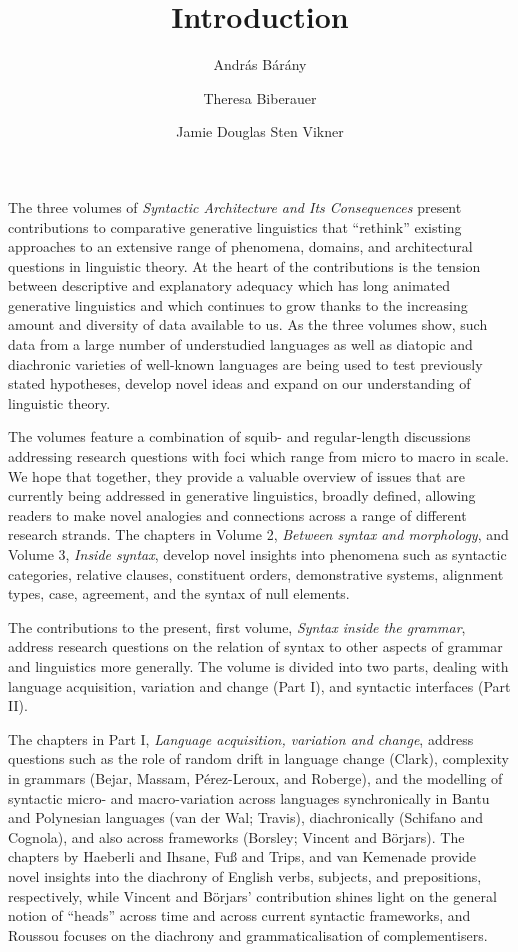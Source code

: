 \documentclass[output=paper]{langsci/langscibook}
\author{András Bárány\affiliation{Leiden University}\and
        Theresa Biberauer\affiliation{University of Cambridge, Stellenbosch
        University, University of the West Cape}\and
        Jamie Douglas\lastand
        Sten Vikner\affiliation{Aarhus University}}
\title{Introduction}
\begin{document}
\noindent The three volumes of \emph{Syntactic Architecture and Its
Consequences} present contributions to comparative generative linguistics that
\enquote{rethink} existing approaches to an extensive range of phenomena,
domains, and architectural questions in linguistic theory. At the heart of the
contributions is the tension between descriptive and explanatory adequacy which
has long animated generative linguistics and which continues to grow thanks to
the increasing amount and diversity of data available to us. As the three
volumes show, such data from a large number of understudied languages as well
as diatopic and diachronic varieties of well-known languages are being used to
test previously stated hypotheses, develop novel ideas and expand on our
understanding of linguistic theory.

The volumes feature a combination of squib- and regular-length discussions
addressing research questions with foci which range from micro to macro in
scale. We hope that together, they provide a valuable overview of issues that
are currently being addressed in generative linguistics, broadly defined,
allowing readers to make novel analogies and connections across a range of
different research strands. The chapters in Volume 2, \emph{Between syntax and
morphology}, and Volume 3, \emph{Inside syntax}, develop novel insights into
phenomena such as syntactic categories, relative clauses, constituent orders,
demonstrative systems, alignment types, case, agreement, and the syntax of null
elements.

The contributions to the present, first volume, \emph{Syntax inside the
grammar}, address research questions on the relation of syntax to other aspects
of grammar and linguistics more generally. The volume is divided into two
parts, dealing with language acquisition, variation and change (Part I), and
syntactic interfaces (Part II).

The chapters in Part I, \emph{Language acquisition, variation and change},
address questions such as the role of random drift in language change (Clark),
complexity in grammars (Bejar, Massam, Pérez-Leroux, and Roberge), and the
modelling of syntactic micro- and macro-variation across languages
synchronically in Bantu and Polynesian languages (van der Wal; Travis),
diachronically (Schifano and Cognola), and also across frameworks (Borsley;
Vincent and Börjars). The chapters by Haeberli and Ihsane, Fuß and Trips, and
van Kemenade provide novel insights into the diachrony of English verbs,
subjects, and prepositions, respectively, while Vincent and Börjars’
contribution shines light on the general notion of \enquote{heads} across time
and across current syntactic frameworks, and Roussou focuses on the diachrony
and grammaticalisation of complementisers.
\end{document}
